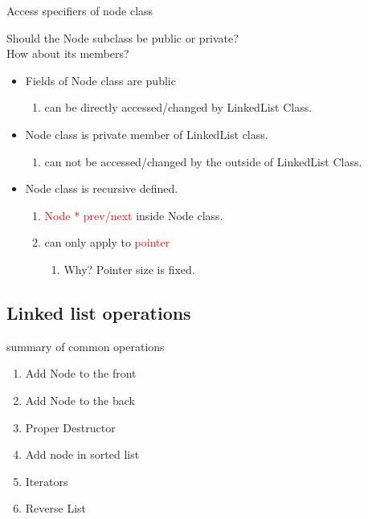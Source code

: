 \documentclass{beamer}
\begin{document}
\begin{frame}{Access specifiers of node class}
\begin{block}{Should the Node subclass be public or private?
\\How about its members?}
    \begin{itemize}
        \item Fields of Node class are public
            \begin{enumerate}
                \item can be directly accessed/changed by LinkedList Class.
            \end{enumerate}
        \item Node class is private member of LinkedList class.
            \begin{enumerate}
                \item can not be accessed/changed by the outside of LinkedList Class.
            \end{enumerate}
        \item Node class is recursive defined.
            \begin{enumerate}
                \item \textcolor{red}{Node * prev/next} inside Node class.
                \item can only apply to \textcolor{red}{pointer}
                \begin{enumerate}
                    \item Why? Pointer size is fixed.
                \end{enumerate}
            \end{enumerate}
    \end{itemize}
    \end{block}
\end{frame}

\subsection{Linked list operations}

\begin{frame}{summary of common operations}
    \begin{enumerate}
        \item Add Node to the front 
        \item Add Node to the back
        \item Proper Destructor
        \item Add node in sorted list
        \item Iterators
        \item Reverse List
    \end{enumerate}
\end{frame}
\end{document}
